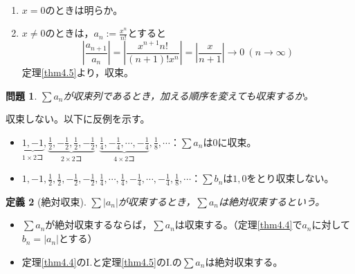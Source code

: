 \documentclass[dvipdfmx,a4j,10pt]{jsarticle}
\makeatletter
\theoremstyle{mystyle1}
\newtheorem{dfn}{定義}[part]
\newtheorem{qes}[dfn]{問題}
\theoremstyle{mystyle2}
\newtheorem{ans}{解答}
\renewenvironment{ans}[1][解答]{\par
  \pushQED{\qed}%
  \normalfont
  \topsep6\p@\@plus6\p@ \trivlist
  \item[\hskip\labelsep{\bfseries\sffamily #1}]\ignorespaces
}{%
  \popQED\endtrivlist\@endpefalse
}
\makeatother
\begin{document}
\begin{ans}[例題\ref{ex4.1}の解答（前半）]\
\begin{enumerate}
\renewcommand{\labelenumi}{Case\arabic{enumi}.}
\item $x=0$のときは明らか。
\item $x\neq 0$のときは，$\displaystyle a_n:=\frac{x^n}{n!}$とすると
	\[\left|\frac{a_{n+1}}{a_n}\right|=\left|\frac{x^{n+1}n!}{(n+1)!x^n}\right|=\left|\frac{x}{n+1}\right|\to0\ (n\to\infty)\]
	定理\ref{thm4.5}より，収束。
\end{enumerate}
\end{ans}

\newpage

\begin{shaded}
\begin{qes}\label{q4.6}
	$\displaystyle\sum a_n$が収束列であるとき，加える順序を変えても収束するか。
\end{qes}
\end{shaded}

\begin{ans}[解答\ref{q4.6}]
    収束しない。以下に反例を示す。
    \begin{itemize}
    \item $\displaystyle \underbrace{1,-1}_{1\times 2コ},\underbrace{\frac{1}{2},-\frac{1}{2},\frac{1}{2},-\frac{1}{2}}_{2\times 2コ},\underbrace{\frac{1}{4},-\frac{1}{4},\cdots,-\frac{1}{4}}_{4\times 2コ},\frac{1}{8},\cdots$：$\displaystyle\sum a_n$は$0$に収束。
    \item $\displaystyle 1,-1,\frac{1}{2},\frac{1}{2},-\frac{1}{2},-\frac{1}{2},\frac{1}{4},\cdots,\frac{1}{4},-\frac{1}{4},\cdots,-\frac{1}{4},\frac{1}{8},\cdots$：$\displaystyle\sum b_n$は$1,0$をとり収束しない。
    \end{itemize}
\end{ans}

\begin{framed}
    \begin{dfn}[絶対収束]
        $\displaystyle\sum |a_n|$が収束するとき，$\displaystyle\sum a_n$は絶対収束するという。
    \end{dfn}
\end{framed}

\begin{itemize}
    \item $\displaystyle\sum a_n$が絶対収束するならば，$\displaystyle\sum a_n$は収束する。（定理\ref{thm4.4}で$a_n$に対して$b_n=|a_n|$とする）
    \item 定理\ref{thm4.4}のI.と定理\ref{thm4.5}のI.の$\displaystyle\sum a_n$は絶対収束する。
\end{itemize}
\end{document}
